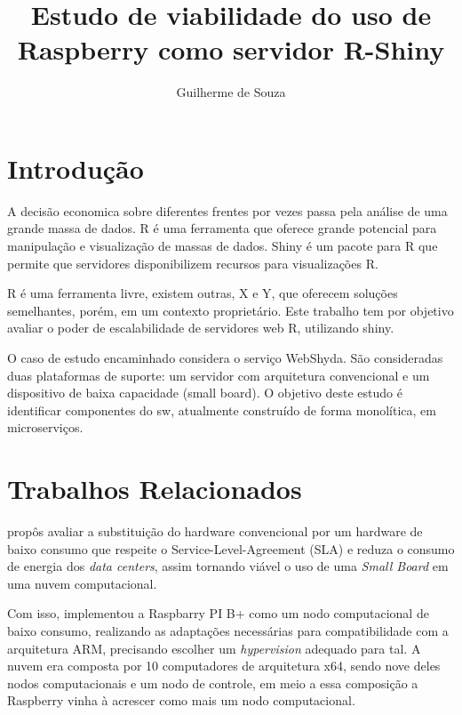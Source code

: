 \documentclass[12pt,english,brazil]{article}
\title{Estudo de viabilidade do uso de Raspberry como servidor R-Shiny}
\author{Guilherme de Souza\inst{1}}
\begin{document}
 

\maketitle
    
\en
\begin{abstract}


\end{abstract}

\br
\begin{resumo} 


\end{resumo}



\section{Introdução}

A decisão economica sobre diferentes frentes por vezes passa pela análise de uma grande massa de dados. R é uma ferramenta que oferece grande potencial para manipulação e visualização de massas de dados. Shiny é um pacote para R que permite que servidores disponibilizem recursos para visualizações R.

R é uma ferramenta livre, existem outras, X e Y, que oferecem soluções semelhantes, porém, em um contexto proprietário. Este trabalho tem por objetivo avaliar o poder de escalabilidade de servidores web R, utilizando shiny.

O caso de estudo encaminhado considera o serviço WebShyda. São consideradas duas plataformas de suporte: um servidor com arquitetura convencional e um dispositivo de baixa capacidade (small board). O objetivo deste estudo é identificar componentes do sw, atualmente construído de forma monolítica, em microserviços. 

\section{Trabalhos Relacionados} \label{sec:TrabalhosRelacionados}
\cite{Joao} propôs avaliar a substituição do hardware convencional por um hardware de baixo consumo que respeite o Service-Level-Agreement (SLA) e reduza o consumo de energia dos \textit{data centers}, assim tornando viável o uso de uma \textit{Small Board} em uma nuvem computacional.

Com isso, implementou a Raspbarry PI B+ como um nodo computacional de baixo consumo, realizando as adaptações necessárias para compatibilidade com a arquitetura ARM, precisando escolher um \textit{hypervision} adequado para tal. A nuvem era composta por 10 computadores de arquitetura x64, sendo nove deles nodos computacionais e um nodo de controle, em meio a essa composição a Raspberry vinha à acrescer como mais um nodo computacional.
\end{document}
